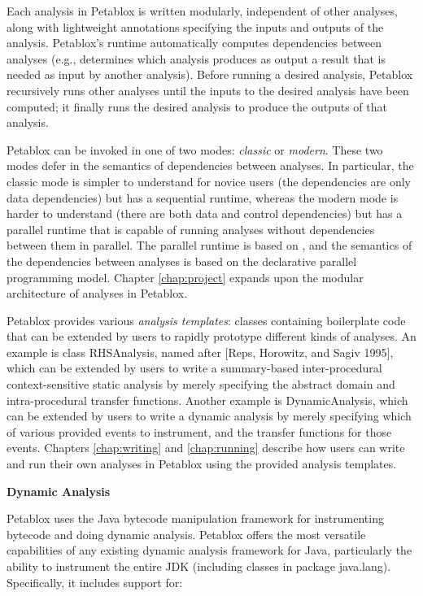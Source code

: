 Each analysis in Petablox is written modularly, independent of other analyses,
along with lightweight annotations specifying the inputs and outputs of the
analysis.  Petablox's runtime automatically computes dependencies between analyses
(e.g., determines which analysis produces as output a result that is needed as
input by another analysis).  Before running a desired analysis, Petablox
recursively runs other analyses until the inputs to the desired analysis have
been computed; it finally runs the desired analysis to produce the outputs of
that analysis.

Petablox can be invoked in one of two modes: {\it classic} or {\it modern}.  These
two modes defer in the semantics of dependencies between analyses.  In
particular, the classic mode is simpler to understand for novice users (the
dependencies are only data dependencies) but has a sequential runtime, whereas
the modern mode is harder to understand (there are both data and control
dependencies) but has a parallel runtime that is capable of running analyses
without dependencies between them in parallel.  The parallel runtime is based on
, and the semantics of
the dependencies between analyses is based on the
declarative parallel programming model.  Chapter \ref{chap:project} expands upon
the modular architecture of analyses in Petablox.

Petablox provides various {\it analysis templates}: classes containing boilerplate
code that can be extended by users to rapidly prototype different kinds of
analyses.  An example is class RHSAnalysis, named after [Reps, Horowitz, and
Sagiv 1995], which can be extended by users to write a summary-based
inter-procedural context-sensitive static analysis by merely specifying the
abstract domain and intra-procedural transfer functions.  Another example is
DynamicAnalysis, which can be extended by users to write a dynamic analysis by
merely specifying which of various provided events to instrument, and the
transfer functions for those events.  Chapters \ref{chap:writing} and
\ref{chap:running} describe how users can write and run their own analyses in
Petablox using the provided analysis templates.

{\bf Dynamic Analysis}

Petablox uses the  Java bytecode
manipulation framework for instrumenting bytecode and doing dynamic analysis.
Petablox offers the most versatile capabilities of any existing dynamic analysis
framework for Java, particularly the ability to instrument the entire JDK
(including classes in package java.lang).  Specifically, it includes support
for:

